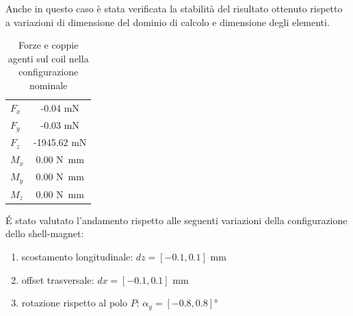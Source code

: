 Anche in questo caso è stata verificata la stabilità del risultato ottenuto rispetto a variazioni di dimensione del dominio di calcolo e dimensione degli elementi.

\begin{table}
\centering
\caption{Forze e coppie agenti sul coil nella configurazione nominale}
\label{tab:M4shellcoilforces1}
\begin{tabular}{lc}
\toprule
$F_x$ & -0.04 mN\\
$F_y$ & -0.03 mN\\
$F_z$ & -1945.62 mN\\
$M_x$ & 0.00 N~mm\\
$M_y$ & 0.00 N~mm\\
$M_z$ & 0.00 N~mm\\
\bottomrule
\end{tabular}
\end{table}

\'E stato valutato l'andamento rispetto alle seguenti variazioni della configurazione dello shell-magnet:
\begin{enumerate}
\item scostamento longitudinale: $dz = \left[-0.1,0.1\right]$ mm
\item offset trasversale: $dx = \left[-0.1,0.1\right]$ mm
\item rotazione rispetto al polo $P$: $\alpha_y = \left[-0.8,0.8\right]$°
\end{enumerate}


